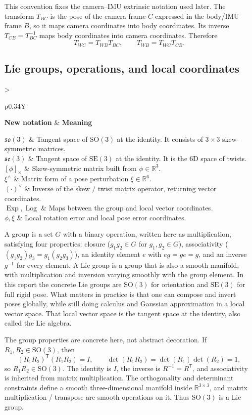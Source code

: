 \documentclass[11pt]{report}
\newcommand{\SO}{\mathrm{SO}(3)}
\newcommand{\SE}{\mathrm{SE}(3)}
\newcommand{\soLie}{\mathfrak{so}(3)}
\newcommand{\seLie}{\mathfrak{se}(3)}
\newcommand{\R}{\mathbb{R}}
\newcommand{\Exp}{\operatorname{Exp}}
\newcommand{\Log}{\operatorname{Log}}
\newcommand{\tran}{^{\mathsf T}}
\newcommand{\NotationTable}[1]{%
\vspace{0.6mm}
{\scriptsize
\setlength{\tabcolsep}{2.5pt}
\begin{tabularx}{\columnwidth}{>{\raggedright\arraybackslash}p{0.34\columnwidth}Y}
\toprule
\textbf{New notation} & \textbf{Meaning}\\
\midrule
#1\\
\bottomrule
\end{tabularx}}
\vspace{0.8mm}}
\begin{document}
This convention fixes the camera--IMU extrinsic notation used later. The transform $T_{BC}$ is the pose of the camera frame $C$ expressed in the body/IMU frame $B$, so it maps camera coordinates into body coordinates. Its inverse $T_{CB}=T_{BC}^{-1}$ maps body coordinates into camera coordinates. Therefore
\[
T_{WC}=T_{WB}T_{BC},
\qquad
T_{WB}=T_{WC}T_{CB}.
\]

\subsection{Lie groups, operations, and local coordinates}
\NotationTable{
$\soLie$ & Tangent space of $\SO$ at the identity. It consists of $3\times3$ skew-symmetric matrices.\\
$\seLie$ & Tangent space of $\SE$ at the identity. It is the 6D space of twists.\\
$[\phi]_{\times}$ & Skew-symmetric matrix built from $\phi\in\R^3$.\\
$\xi^\wedge$ & Matrix form of a pose perturbation $\xi\in\R^6$.\\
$(\cdot)^\vee$ & Inverse of the skew / twist matrix operator, returning vector coordinates.\\
$\Exp,\Log$ & Maps between the group and local vector coordinates.\\
$\phi,\xi$ & Local rotation error and local pose error coordinates.}

A group is a set $G$ with a binary operation, written here as multiplication, satisfying four properties: closure ($g_1g_2\in G$ for $g_1,g_2\in G$), associativity ($(g_1g_2)g_3=g_1(g_2g_3)$), an identity element $e$ with $eg=ge=g$, and an inverse $g^{-1}$ for every element. A Lie group is a group that is also a smooth manifold, with multiplication and inversion varying smoothly with the group element. In this report the concrete Lie groups are $\SO$ for orientation and $\SE$ for full rigid pose. What matters in practice is that one can compose and invert poses globally, while still doing calculus and Gaussian approximation in a local vector space. That local vector space is the tangent space at the identity, also called the Lie algebra.

The group properties are concrete here, not abstract decoration. If $R_1,R_2\in\SO$, then
\begin{equation}
(R_1R_2)\tran(R_1R_2)=I,\qquad \det(R_1R_2)=\det(R_1)\det(R_2)=1,
\end{equation}
so $R_1R_2\in\SO$. The identity is $I$, the inverse is $R^{-1}=R\tran$, and associativity is inherited from matrix multiplication. The orthogonality and determinant constraints define a smooth three-dimensional manifold inside $\R^{3\times3}$, and matrix multiplication / transpose are smooth operations on it. Thus $\SO$ is a Lie group.
\end{document}
